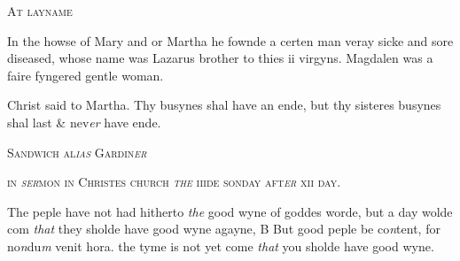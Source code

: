 \documentclass[12pt, a4paper]{book}
\begin{document}
			
 

                  
				\begin{center}  {\scshape At layname}  \end{center}
			

 
		\ifthenelse{\isodd{\thepage}}
		{\reversemarginpar}
		{\normalmarginpar}
		In the howse of Mary and or Martha he fownde a
 certen man veray sicke and sore diseased, whose name
 was Lazarus brother to thies ii virgyns.
 Magdalen was a faire fyngered gentle woman.
 
				\marginpar[\vspace{0.5cm}{\textcolor{Gray}{or religion n}}]{}
			
		\ifthenelse{\isodd{\thepage}}
		{\reversemarginpar}
		{\normalmarginpar}
		Christ said to Martha. Thy busynes shal have an
 ende, but thy sisteres busynes shal last \& nev\textit{er }have ende.
 

            
            
            	
				\begin{center} \begin{large} {\scshape Sandwich al\textit{ias} Gardin\textit{er }
               } \end{large} \end{center}
			
               
                  
				\begin{center}  {\scshape in \textit{ser}mon in
 Christes church 
                        \textit{the} iiide sonday aft\textit{er} xii day.}  \end{center}
			

               	
				\marginpar[\vspace{0.5cm}{\textcolor{Gray}{seditious}}]{}
			
				\marginpar[\vspace{0.5cm}{\textcolor{Gray}{n}}]{}
			
		\ifthenelse{\isodd{\thepage}}
		{\reversemarginpar}
		{\normalmarginpar}
		The peple have not had hitherto \textit{the} good wyne of
 goddes worde, but a day wolde com \textit{that} they sholde have
 good wyne agayne, B But good peple be co\textit{n}tent, for
 no\textit{n}du\textit{m} venit hora. the tyme is not yet come \textit{that} you
 sholde have good wyne.
               	
\end{document}
